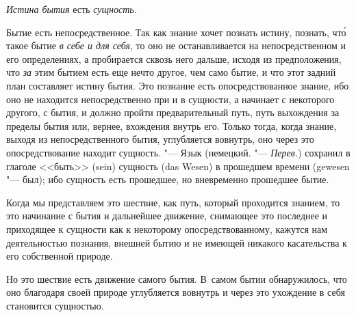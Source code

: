 {\em Истина бытия} есть {\em сущность}.

Бытие есть непосредственное. Так как знание хочет познать истину, познать,
чт\'{о} такое бытие {\em в себе и для себя}, то оно не
останавливается на непосредственном и его определениях, а пробирается
сквозь него дальше, исходя из предположения, что
{\em за} этим бытием есть еще нечто другое, чем само
бытие, и что этот задний план составляет истину бытия. Это познание есть
опосредствованное знание, ибо оно не находится непосредственно при и в
сущности, а начинает с некоторого другого, с бытия, и должно пройти
предварительный путь, путь выхождения за пределы бытия или, вернее,
вхождения внутрь его. Только тогда, когда знание, выходя из
непосредственного бытия, углубляется вовнутрь, оно через это
опосредствование находит сущность. "--- Язык (немецкий. "--- {\em Перев.})
сохранил в глаголе <<быть>> (sein) сущность (das Wesen) в прошедшем времени
(gewesen "--- был); ибо сущность есть прошедшее, но вневременно прошедшее
бытие.

Когда мы представляем это шествие, как путь, который проходится знанием, то
это начинание с бытия и дальнейшее движение, снимающее это последнее и
приходящее к сущности как к некоторому опосредствованному, кажутся нам
деятельностью познания, внешней бытию и не имеющей никакого касательства к
его собственной природе.

Но это шествие есть движение самого бытия. В~самом бытии обнаружилось, что
оно благодаря своей природе углубляется вовнутрь и через это ухождение в
себя становится сущностью.


